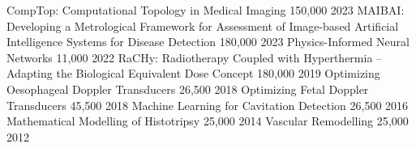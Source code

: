 \documentclass[11pt, a4paper]{awesome-cv}
\begin{document}
\begin{cvhonorsStretch}
%
{}%
{CompTop: Computational Topology in Medical Imaging}%
{\texteuro{}150,000}%
{2023}
%
%
{}%
{MAIBAI: Developing a Metrological Framework for Assessment of Image-based Artificial Intelligence Systems for Disease Detection}%
{\texteuro{}180,000}%
{2023}
%
%
{Physics-Informed Neural Networks }%
{\texteuro{}11,000}%
{2022}
%
%
{RaCHy: Radiotherapy Coupled with Hyperthermia -- Adapting the Biological Equivalent Dose Concept}%
{\textsterling{}180,000}%
{2019}
%
%
{Optimizing Oesophageal Doppler Transducers}%
{\textsterling{}26,500}%
{2018}
%
%
{Optimizing Fetal Doppler Transducers}%
{\textsterling{}45,500}%
{2018}
%
%
{Machine Learning for Cavitation Detection}%
{\textsterling{}26,500}%
{2016}
%
%
{Mathematical Modelling of Histotripsy}%
{\textsterling{}25,000}%
{2014}
%
%
{Vascular Remodelling}%
{\textsterling{}25,000}%
{2012}
%
\end{cvhonorsStretch}

%
%
%
%
%
\end{document}
